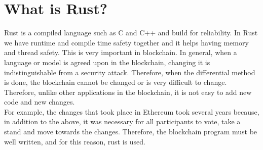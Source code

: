 \documentclass{report}
\begin{document}
\section{What is Rust?}
Rust is a compiled language such as C and C++ and build for reliability. In Rust we have runtime and compile time safety together and it helps having memory and thread safety. This is very important in blockchain. In general, when a language or model is agreed upon in the blockchain, changing it is indistinguishable from a security attack. Therefore, when the differential method is done, the blockchain cannot be changed or is very difficult to change. Therefore, unlike other applications in the blockchain, it is not easy to add new code and new changes.\\ For example, the changes that took place in Ethereum took several years because, in addition to the above, it was necessary for all participants to vote, take a stand and move towards the changes. Therefore, the blockchain program must be well written, and for this reason, rust is used.
\end{document}

